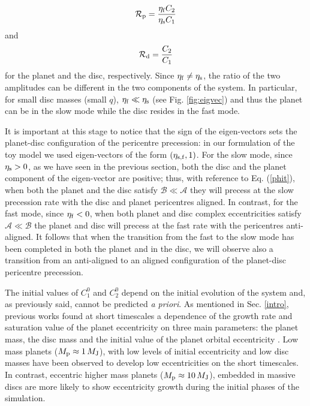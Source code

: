 \documentclass[usenatbib,a4paper,times,fleqn]{mnras}
\begin{document}
\begin{equation}
\mathcal{R}_{\rm p}=\frac{\eta_{\rm f}C_2}{\eta_{\rm s}C_1}
\end{equation}
and
\begin{equation}
\mathcal{R}_{\rm d}=\frac{C_2}{C_1}
\end{equation}
for the planet and the disc, respectively. Since $\eta_{\rm f}\neq\eta_{\rm s}$, the ratio of the two amplitudes can be different in the two components of the system. In particular, for small disc masses (small $q$), $\eta_{\rm f}\ll \eta_{\rm s}$ (see Fig. \ref{fig:eigvec}) and thus the planet can be in the slow mode while the disc resides in the fast mode. 

It is important at this stage to notice that the sign of the eigen-vectors sets the planet-disc configuration of the pericentre precession: in our formulation of the toy model we used eigen-vectors of the form $(\eta_{\rm s,f},1)$. For the slow mode, since $\eta_{\rm s}>0$, as we have seen in the previous section, both the disc and the planet component of the eigen-vector are positive; thus, with reference to Eq. (\ref{phit}), when both the planet and the disc satisfy $\mathcal B\ll \mathcal A$ they will precess at the slow precession rate with the disc and planet pericentres aligned. In contrast, for the fast mode, since $\eta_{\rm f}<0$, when both planet and disc complex eccentricities satisfy $\mathcal A\ll \mathcal B$ the planet and disc will precess at the fast rate with the pericentres anti-aligned. It follows that when the transition from the fast to the slow mode has been completed in both the planet and in the disc, we will observe also a transition from an anti-aligned to an aligned configuration of the planet-disc pericentre precession.

The initial values of $C_1^0$ and $C_2^0$ depend on the initial evolution of the system and, as previously said, cannot be predicted {\it a priori}. As mentioned in Sec. \ref{intro}, previous works found at short timescales a dependence of the growth rate and saturation value of the planet eccentricity on three main parameters: the planet mass, the disc mass and the initial value of the planet orbital eccentricity \citep{papaloizou2001,dangelo2006,dunhill2013,muller2013,duffell2015,thun2017}. Low mass planets ($M_{\rm p}\approx 1 \,M_{\rm J}$), with low levels of initial eccentricity and low disc masses have been observed to develop low eccentricities on the short timescales. In contrast, eccentric higher mass planets ($M_{\rm p}\approx 10 \,M_{\rm J}$), embedded in massive discs are more likely to show eccentricity growth during the initial phases of the simulation.
\end{document}
